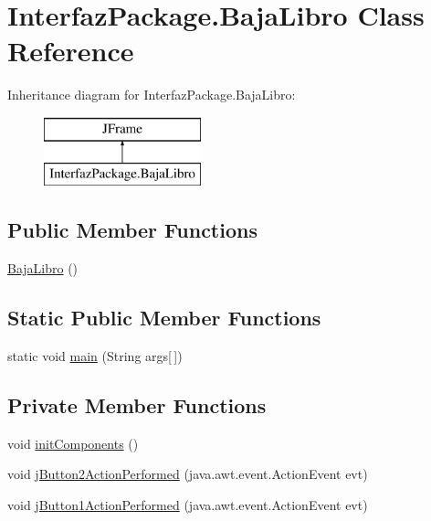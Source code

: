 \hypertarget{class_interfaz_package_1_1_baja_libro}{}\section{Interfaz\+Package.\+Baja\+Libro Class Reference}
\label{class_interfaz_package_1_1_baja_libro}
Inheritance diagram for Interfaz\+Package.\+Baja\+Libro\+:\begin{figure}[H]
\begin{center}
\leavevmode
\includegraphics[height=2.000000cm]{class_interfaz_package_1_1_baja_libro}
\end{center}
\end{figure}
\subsection*{Public Member Functions}
\begin{DoxyCompactItemize}
\item 
\mbox{\hyperlink{class_interfaz_package_1_1_baja_libro_a2675599a2976eb47169b0b174c7ee93a}{Baja\+Libro}} ()
\end{DoxyCompactItemize}
\subsection*{Static Public Member Functions}
\begin{DoxyCompactItemize}
\item 
static void \mbox{\hyperlink{class_interfaz_package_1_1_baja_libro_a8915e7da833ff9189bfa77b49bb5d10b}{main}} (String args\mbox{[}$\,$\mbox{]})
\end{DoxyCompactItemize}
\subsection*{Private Member Functions}
\begin{DoxyCompactItemize}
\item 
void \mbox{\hyperlink{class_interfaz_package_1_1_baja_libro_addc7b5927a42ad6e51cf8b576df6533d}{init\+Components}} ()
\item 
void \mbox{\hyperlink{class_interfaz_package_1_1_baja_libro_a52b4bc390d2eed69360ad1c46161f230}{j\+Button2\+Action\+Performed}} (java.\+awt.\+event.\+Action\+Event evt)
\item 
void \mbox{\hyperlink{class_interfaz_package_1_1_baja_libro_af574e4504923035ec61a72af0a5885ab}{j\+Button1\+Action\+Performed}} (java.\+awt.\+event.\+Action\+Event evt)
\end{DoxyCompactItemize}
